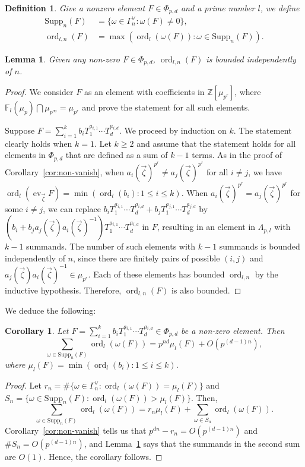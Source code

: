 \documentclass[11pt]{amsart}
\DeclareMathOperator{\ord}{ord}
\DeclareMathOperator{\ev}{ev}
\newtheorem{lemma}[theorem]{Lemma}
\newtheorem{corollary}[theorem]{Corollary}
\newtheorem{defn}[theorem]{Definition}
\numberwithin{equation}{section}
\theoremstyle{remark}
\newcommand{\Supp}{\mathrm{Supp}}
\newcommand{\?}{\stackrel{?}{=}}
\newcommand{\ZZ}{\mathbb{Z}}
\newcommand{\Fl}{\mathbb{F}_l}
\begin{document}
\begin{defn}
    Give a nonzero element $F\in\Phi_{p,d}$ and a prime number $l$, we define
    \begin{align*}
        \Supp_n(F)&=\{\omega\in \Gamma_n^\vee:\omega(F)\ne0\},\\
        \ord_{l,n}(F)&=\max(\ord_l(\omega(F)):\omega\in\Supp_n(F)).
    \end{align*}
\end{defn}

\begin{lemma}\label{lem:boundedvaluations}
    Given any non-zero $F\in\Phi_{p,d}$, $\ord_{l,n}(F)$ is bounded independently of $n$.
\end{lemma}

\begin{proof}
We consider $F$ as an element with coefficients in $\ZZ[\mu_{p^r}]$, where $\Fl(\mu_p)\bigcap\mu_{p^\infty}=\mu_{p^r}$ and prove the statement for all such elements.

Suppose $F=\sum_{i=1}^kb_iT_1^{a_{i,1}}\cdots T_d^{a_{i,d}}$. We proceed by induction on $k$. The statement clearly holds when $k=1$. Let $k\ge2$ and assume that the statement holds for all elements in $\Phi_{p,d}$ that are  defined as a sum of $k-1$ terms. As in the proof of Corollary~\ref{cor:non-vanish}, when $a_{i}(\vec\zeta)^{p^r}\ne a_{j}(\vec\zeta)^{p^r}$ for all $i \ne j$, we have $\ord_l(\ev_{\vec\zeta}F)=\min(\ord_l(b_i):1\le i \le k)$. When $a_i(\vec\zeta)^{p^r}=a_j(\vec\zeta)^{p^r}$ for some $i\ne j$, we can replace $b_iT_1^{a_{i,1}}\cdots T_d^{a_{i,d}}+b_jT_1^{a_{j,1}}\cdots T_d^{a_{j,d}}$ by $(b_i+b_ja_j(\vec\zeta)a_i(\vec\zeta)^{-1})T_1^{a_{i,1}}\cdots T_d^{a_{i,d}}$ in $F$, resulting in an element in $\Lambda_{p,l}$ with $k-1$ summands. The number of such elements with $k-1$ summands is bounded independently of $n$,  since there are finitely pairs of possible $(i,j)$ and $a_j(\vec\zeta)a_i(\vec\zeta)^{-1}\in\mu_{p^r}$.
Each of these elements has bounded $\ord_{l,n}$ by the inductive hypothesis. Therefore, $\ord_{l,n}(F)$ is also bounded.
\end{proof}

We deduce the following:
\begin{corollary}\label{cor:formula}
    Let $F=\sum_{i=1}^kb_iT_1^{a_{i,1}}\cdots T_d^{a_{i,d}}\in \Phi_{p,d}$ be a non-zero element. Then
    \[
    \sum_{\omega\in\Supp_n(F)}\ord_l(\omega(F))=p^{nd}\mu_l(F)+O(p^{(d-1)n}),
    \]
    where $\mu_l(F)=\min(\ord_l(b_i):1\le i\le k)$.    
\end{corollary}
\begin{proof}
Let $r_n=\#\{\omega\in\Gamma_n^\vee:\ord_l(\omega(F))=\mu_l(F)\}$ and $S_n=\{\omega\in\Supp_n(F):\ord_l(\omega(F))>\mu_l(F)\}$.   
Then,
\[\sum_{\omega\in\Supp_n(F)}\ord_l(\omega(F))=r_n\mu_l(F)+\sum_{\omega\in S_n}\ord_l(\omega(F)).
\]
Corollary~\ref{cor:non-vanish} tells us that $p^{dn}-r_n=O(p^{(d-1)n})$ and $\#S_n=O(p^{(d-1)n})$, and Lemma~\ref{lem:boundedvaluations} says that the summands in the second sum are $O(1)$. Hence, the corollary follows.
\end{proof}
\end{document}
